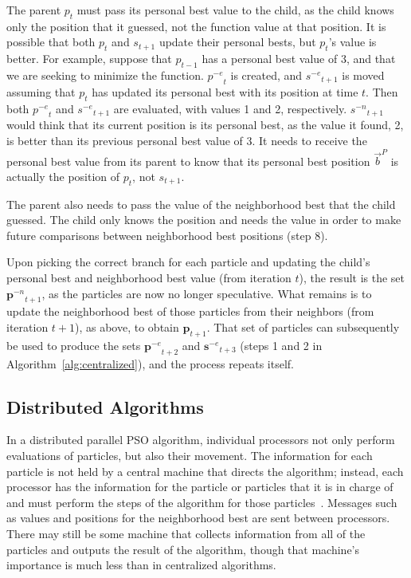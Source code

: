 \documentclass[smallcondensed]{svjour3}
\newcommand{\alg}[1]{Algorithm~\ref{alg:#1}}
\providecommand{\pers}{\ensuremath{P}}
\providecommand{\pbest}{\ensuremath{\Vec{b}^\pers}}
\providecommand{\noeval}[1]{\ensuremath{#1^{-e}}}
\providecommand{\nonbest}[1]{\ensuremath{#1^{-n}}}
\providecommand{\p}{\ensuremath{p}}
\providecommand{\pset}{\ensuremath{\mathbf{p}}}
\providecommand{\s}{\ensuremath{s}}
\providecommand{\sset}{\ensuremath{\mathbf{s}}}
\begin{document}
The parent $\p_t$ must pass its personal best value to the child, as the child
knows only the position that it guessed, not the function value at that
position.  It is possible that both $\p_t$ and $\s_{t+1}$ update their personal
bests, but $\p_t$'s value is better.  For example, suppose that $\p_{t-1}$ has
a personal best value of 3, and that we are seeking to minimize the function.
$\noeval{\p}_t$ is created, and $\noeval{\s}_{t+1}$ is moved assuming that
$\p_t$ has updated its personal best with its position at time $t$.  Then both
$\noeval{\p}_t$ and $\noeval{\s}_{t+1}$ are evaluated, with values 1 and 2,
respectively.  $\nonbest{\s}_{t+1}$ would think that its current position is
its personal best, as the value it found, 2, is better than its previous
personal best value of 3.  It needs to receive the personal best value from its
parent to know that its personal best position $\pbest$ is actually the
position of $\p_t$, not $\s_{t+1}$.

The parent also needs to pass the value of the neighborhood best that the child
guessed.  The child only knows the position and needs the value in order to
make future comparisons between neighborhood best positions (step 8).

Upon picking the correct branch for each particle and updating the child's
personal best and neighborhood best value (from iteration $t$), the result is
the set $\nonbest{\pset}_{t+1}$, as the particles are now no longer
speculative.  What remains is to update the neighborhood best of those
particles from their neighbors (from iteration $t+1$), as above, to obtain
$\pset_{t+1}$.  That set of particles can subsequently be used to produce the
sets $\noeval{\pset}_{t+2}$ and $\noeval{\sset}_{t+3}$ (steps 1 and 2 in
\alg{centralized}), and the process repeats itself.

\subsection{Distributed Algorithms}

\label{sec:distributed}

In a distributed parallel PSO algorithm, individual processors not only perform
evaluations of particles, but also their movement.  The information for each
particle is not held by a central machine that directs the algorithm; instead,
each processor has the information for the particle or particles that it is in
charge of and must perform the steps of the algorithm for those
particles~\citep{mcnabb-2007-parallel-pso-using-mapreduce}.  Messages such as
values and positions for the neighborhood best are sent between processors.
There may still be some machine that collects information from all of the
particles and outputs the result of the algorithm, though that machine's
importance is much less than in centralized algorithms.
\end{document}
